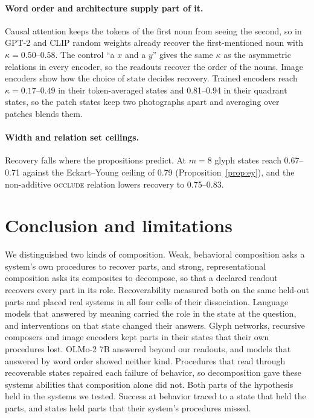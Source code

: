 \paragraph{Word order and architecture supply part of it.} Causal attention keeps the tokens of the first noun from seeing the second, so in GPT-2 and CLIP random weights already recover the first-mentioned noun with $\kappa = 0.50$--$0.58$. The control ``a $x$ and a $y$'' gives the same $\kappa$ as the asymmetric relations in every encoder, so the readouts recover the order of the nouns. Image encoders show how the choice of state decides recovery. Trained encoders reach $\kappa = 0.17$--$0.49$ in their token-averaged states and 0.81--0.94 in their quadrant states, so the patch states keep two photographs apart and averaging over patches blends them.

\paragraph{Width and relation set ceilings.} Recovery falls where the propositions predict. At $m = 8$ glyph states reach 0.67--0.71 against the Eckart--Young ceiling of 0.79 (Proposition~\ref{prop:ey}), and the non-additive \textsc{occlude} relation lowers recovery to 0.75--0.83.

\RHMPARA

\section{Conclusion and limitations}
\label{sec:discussion}

We distinguished two kinds of composition. Weak, behavioral composition asks a system's own procedures to recover parts, and strong, representational composition asks its composites to decompose, so that a declared readout recovers every part in its role. Recoverability measured both on the same held-out parts and placed real systems in all four cells of their dissociation. Language models that answered by meaning carried the role in the state at the question, and interventions on that state changed their answers. Glyph networks, recursive composers and image encoders kept parts in their states that their own procedures lost. OLMo-2 7B answered beyond our readouts, and models that answered by word order showed neither kind. Procedures that read through recoverable states repaired each failure of behavior, so decomposition gave these systems abilities that composition alone did not. Both parts of the hypothesis held in the systems we tested. Success at behavior traced to a state that held the parts, and states held parts that their system's procedures missed.

